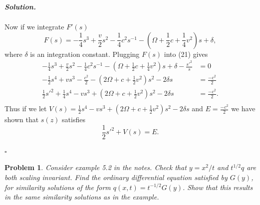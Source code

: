 \documentclass[12pt]{report}
\newtheorem{problem}{Problem}
\newenvironment{solution}[1][\it{Solution}]{\textbf{#1. } }{$\square$}
\newcommand{\paren}[1]{{\left(#1\right)}} %
\begin{document}
\begin{solution}
\begin{enumerate}
\begin{align*}
        \end{align*}
        Now if we integrate $F'(s)$
        \[
            F(s) = - \frac{1}{4}s^3 + \frac{v}{2}s^2 - \frac{1}{4}c^2s^{-1}- \paren{\Omega + \frac{1}{2}c + \frac{1}{4}v^2}s + \delta,
        \]
        where $\delta$ is an integration constant. Plugging $F(s)$ into (21) gives
        \begin{align*}
            - \frac{1}{4}s^3 + \frac{v}{2}s^2 - \frac{1}{4}c^2s^{-1}- \paren{\Omega + \frac{1}{2}c + \frac{1}{4}v^2}s + \delta - \frac{s'^2}{s} &= 0\\
            -\frac{1}{2}s^4 + vs^3 - \frac{c^2}{2} - \paren{2\Omega + c + \frac{1}{2}v^2}s^2 - 2\delta s &= \frac{-c^2}{2}\\
            \frac{1}{2}s'^2 + \frac{1}{4}s^4 - vs^3 + \paren{2\Omega + c + \frac{1}{2}v^2}s^2 - 2\delta s &= \frac{-c^2}{2}.\\
        \end{align*}
        Thus if we let $V(s) = \frac{1}{2}s^4 - vs^3 + \paren{2\Omega + c + \frac{1}{2}v^2}s^2 - 2\delta s$ and $E = \frac{-c^2}{2}$ we have shown that $s(z)$ satisfies
        \[
            \frac{1}{2}s'^2 + V(s) = E.
        \]

    \end{enumerate}
\end{solution}

\newpage



\begin{problem}
    Consider example 5.2 in the notes. Check that $y=x^2/t$ and $t^{1/2} q$ are both scaling invariant. Find the ordinary differential equation satisfied by $G(y)$, for similarity solutions of the form $q(x,t)=t^{-1/2}G(y)$. Show that this results in the same similarity solutions as in the example.
\end{problem}
\end{document}
